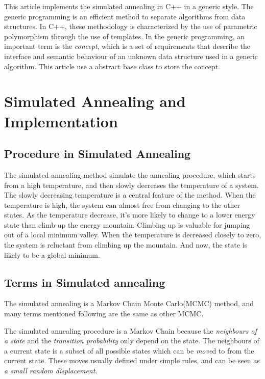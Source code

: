 \documentclass[10.5pt,a4paper]{article}
\begin{document}
This article implements the simulated annealing in C++ in a generic style. The generic programming is an efficient method to separate algorithms from data structures. In C++, these methodology is characterized by the use of parametric polymorphism through the use of templates. In the generic programming, an important term is the \textit{concept}, which is a set of requirements that describe the interface and semantic behaviour of an unknown data structure used in a generic algorithm. This article use a abstract base class to store the concept.

\section{Simulated Annealing and Implementation}

\subsection{Procedure in Simulated Annealing}
The simulated annealing method simulate the annealing procedure, which starts from a high temperature, and then slowly decreases the temperature of a system. The slowly decreasing temperature is a central feature of the method. When the temperature is high, the system can almost free from changing to the other states. As the temperature decrease, it's more likely to change to a lower energy state than climb up the energy mountain. Climbing up is valuable for jumping out of a local minimum valley. When the temperature is decreased closely to zero, the system is reluctant from climbing up the mountain. And now, the state is likely to be a global minimum.
\subsection{Terms in Simulated annealing}
The simulated annealing is a Markov Chain Monte Carlo(MCMC) method, and many terms mentioned following are the same as other MCMC.

The simulated annealing procedure is a Markov Chain because the \textit{neighbours of a state} and the \textit{transition probability} only depend on the state. The neighbours of a current state is a subset of all possible states which can be \textit{move}d to from the current state. These moves usually defined under simple rules, and can be seen as \textit{a small random displacement}.
\end{document}
